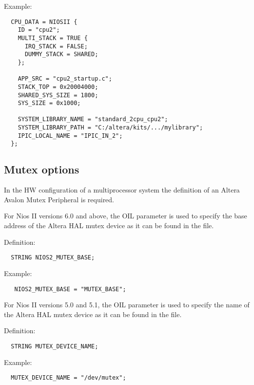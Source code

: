 Example:

\begin{lstlisting}
  CPU_DATA = NIOSII {
    ID = "cpu2";
    MULTI_STACK = TRUE {
      IRQ_STACK = FALSE;
      DUMMY_STACK = SHARED;
    };

    APP_SRC = "cpu2_startup.c";
    STACK_TOP = 0x20004000;
    SHARED_SYS_SIZE = 1800;
    SYS_SIZE = 0x1000; 

    SYSTEM_LIBRARY_NAME = "standard_2cpu_cpu2";
    SYSTEM_LIBRARY_PATH = "C:/altera/kits/.../mylibrary";
    IPIC_LOCAL_NAME = "IPIC_IN_2";
  };
\end{lstlisting}

\subsection{Mutex options}

In the HW configuration of a multiprocessor system the definition of
an Altera Avalon Mutex Peripheral is required. 

For Nios II versions 6.0 and above, the OIL parameter
 is used to specify the base address of the
Altera HAL mutex device as it can be found in the 
file.

Definition:

\begin{lstlisting}
  STRING NIOS2_MUTEX_BASE;
\end{lstlisting}

Example:

\begin{lstlisting}
   NIOS2_MUTEX_BASE = "MUTEX_BASE";
\end{lstlisting}

For Nios II versions 5.0 and 5.1, the OIL parameter
 is used to specify the name of the Altera
HAL mutex device as it can be found in the  file.

Definition:

\begin{lstlisting}
  STRING MUTEX_DEVICE_NAME;
\end{lstlisting}

Example:

\begin{lstlisting}
  MUTEX_DEVICE_NAME = "/dev/mutex";
\end{lstlisting}

